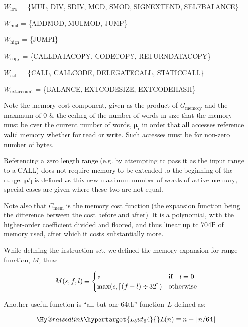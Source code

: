 \documentclass[9pt,oneside]{amsart}
\makeatletter
\newcommand{\linkdest}[1]{\Hy@raisedlink{\hypertarget{#1}{}}}
\DeclarePairedDelimiter{\ceil}{\lceil}{\rceil}
\makeatother
\begin{document}
$W_{\mathrm{low}}$ = \{{\small MUL}, {\small DIV}, {\small SDIV}, {\small MOD}, {\small SMOD}, {\small SIGNEXTEND}, {\small SELFBALANCE}\}

$W_{\mathrm{mid}}$ = \{{\small ADDMOD}, {\small MULMOD}, {\small JUMP}\}

$W_{\mathrm{high}}$ = \{{\small JUMPI}\}

$W_{\mathrm{copy}}$ = \{{\small CALLDATACOPY}, {\small CODECOPY}, {\small RETURNDATACOPY}\}

$W_{\mathrm{call}}$ = \{{\small CALL}, {\small CALLCODE}, {\small DELEGATECALL}, {\small STATICCALL}\}

$W_{\mathrm{extaccount}}$ = \{{\small BALANCE}, {\small EXTCODESIZE}, {\small EXTCODEHASH}\}

Note the memory cost component, given as the product of $G_{\mathrm{memory}}$ and the maximum of 0 \& the ceiling of the number of words in size that the memory must be over the current number of words, $\boldsymbol{\mu}_{\mathrm{i}}$ in order that all accesses reference valid memory whether for read or write. Such accesses must be for non-zero number of bytes.

Referencing a zero length range (e.g. by attempting to pass it as the input range to a CALL) does not require memory to be extended to the beginning of the range. $\boldsymbol{\mu}'_{\mathrm{i}}$ is defined as this new maximum number of words of active memory; special cases are given where these two are not equal.

Note also that $C_{\mathrm{mem}}$ is the memory cost function (the expansion function being the difference between the cost before and after). It is a polynomial, with the higher-order coefficient divided and floored, and thus linear up to 704B of memory used, after which it costs substantially more.

While defining the instruction set, we defined the memory-expansion for range function, $M$, thus:

\nopagebreak
\begin{equation}
M(s, f, l) \equiv \begin{cases}
s & \text{if} \quad l = 0 \\
\max(s, \ceil{ (f + l) \div 32 }) & \text{otherwise}
\end{cases}
\end{equation}

Another useful function is ``all but one 64th'' function~$L$ defined as:

\begin{equation}
\linkdest{L_but_64}{}
L(n) \equiv n - \lfloor n / 64 \rfloor
\end{equation}
\end{document}
